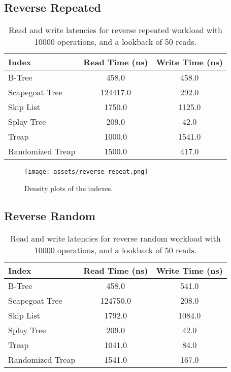 \documentclass[sigconf]{acmart}
\begin{document}
\subsection{Reverse Repeated}
\begin{center}
  \begin{table}[H]
    \begin{tabular}{|l|c|c|}
      \hline
      \bf{Index} & \bf{Read Time (ns)} & \bf{Write Time (ns)} \\
      \hline
      B-Tree&458.0&458.0\\
      \hline
      Scapegoat Tree&124417.0&292.0\\
      \hline
      Skip List&1750.0&1125.0\\
      \hline
      Splay Tree&209.0&42.0\\
      \hline
      Treap&1000.0&1541.0\\
      \hline
      Randomized Treap&1500.0&417.0\\
      \hline
    \end{tabular}
    \caption{Read and write latencies for reverse repeated workload with 10000 operations, and a lookback of 50 reads.}
  \end{table}
\end{center}


\begin{center}
  \begin{figure}[H]
    \texttt{[image: assets/reverse-repeat.png]}
    \caption{Density plots of the indexes.}
  \end{figure}
\end{center}
\newpage

\subsection{Reverse Random}
\begin{center}
  \begin{table}[H]
    \begin{tabular}{|l|c|c|}
      \hline
      \bf{Index} & \bf{Read Time (ns)} & \bf{Write Time (ns)} \\
      \hline
      B-Tree&458.0&541.0\\
      \hline
      Scapegoat Tree&124750.0&208.0\\
      \hline
      Skip List&1792.0&1084.0\\
      \hline
      Splay Tree&209.0&42.0\\
      \hline
      Treap&1041.0&84.0\\
      \hline
      Randomized Treap&1541.0&167.0\\
      \hline

    \end{tabular}
    \caption{Read and write latencies for reverse random workload with 10000 operations, and a lookback of 50 reads.}
  \end{table}
\end{center}
\end{document}

